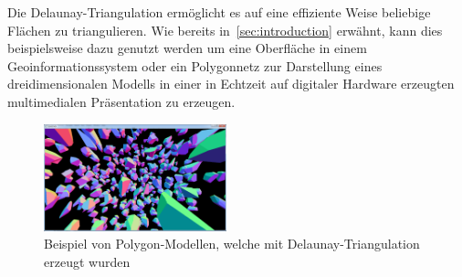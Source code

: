 Die Delaunay-Triangulation ermöglicht es auf eine effiziente Weise beliebige Flächen zu triangulieren. Wie bereits in~\ref{sec:introduction} erwähnt, kann dies beispielsweise dazu genutzt werden um eine Oberfläche in einem Geoinformationssystem oder ein Polygonnetz zur Darstellung eines dreidimensionalen Modells in einer in Echtzeit auf digitaler Hardware erzeugten multimedialen Präsentation zu erzeugen.

\begin{figure}[h]
\centering
\includegraphics[width=200px]{images/voronoi_delaunay_example_02.png}
\caption[width=100px]{Beispiel von Polygon-Modellen, welche mit Delaunay-Triangulation erzeugt wurden\protect\footnotemark}
\label{fig:delaunayVoronoiExample2}
\end{figure}
